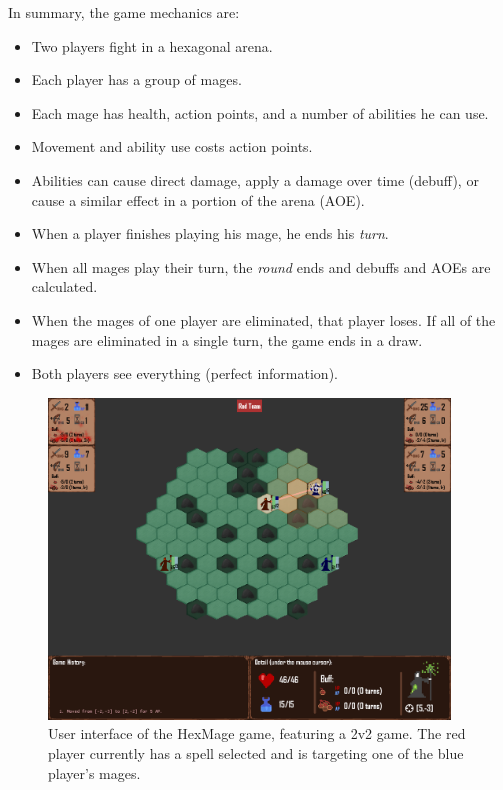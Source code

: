 In summary, the game mechanics are:

\begin{itemize}
	\item Two players fight in a hexagonal arena.
	\item Each player has a group of mages.
	\item Each mage has health, action points, and a number of abilities he can use.
	\item Movement and ability use costs action points.
	\item Abilities can cause direct damage, apply a damage over time (debuff), or cause a similar effect in a portion of the arena (AOE).
	\item When a player finishes playing his mage, he ends his \emph{turn}.
	\item When all mages play their turn, the \emph{round} ends and debuffs and AOEs are calculated.
	\item When the mages of one player are eliminated, that player loses. If all of the mages are eliminated in a single turn, the game ends in a draw.
	\item Both players see everything (perfect information).
\end{itemize}

\begin{figure}[h]
	\centering
	\includegraphics[width=0.95\textwidth]{img/arena.png}
	\caption{User interface of the HexMage game, featuring a 2v2 game. The red player currently has a spell selected and is targeting one of the blue player's mages.}
	\label{fig:arena}
\end{figure}

